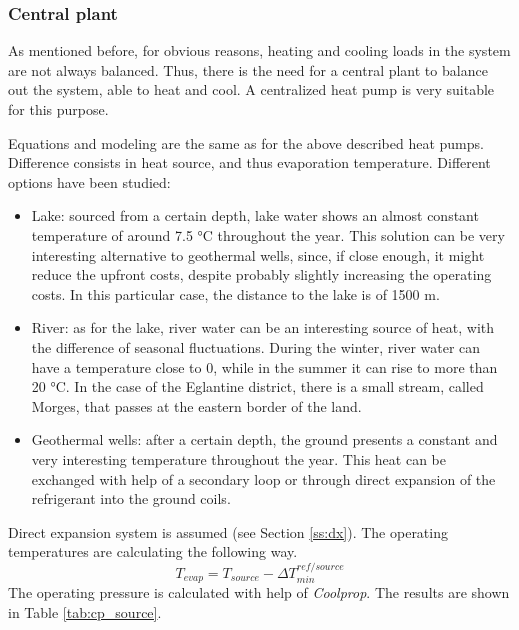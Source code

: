 \documentclass{article}
\begin{document}
\subsubsection{Central plant}
As mentioned before, for obvious reasons, heating and cooling loads in the system are not always balanced. Thus, there is the need for a central plant to balance out the system, able to heat and cool. A centralized heat pump is very suitable for this purpose.

Equations and modeling are the same as for the above described heat pumps. Difference consists in heat source, and thus evaporation temperature. Different options have been studied:
\begin{itemize}
    \item Lake: sourced from a certain depth, lake water shows an almost constant temperature of around 7.5 \si{\celsius} throughout the year. This solution can be very interesting alternative to geothermal wells, since, if close enough, it might reduce the upfront costs, despite probably slightly increasing the operating costs. In this particular case, the distance to the lake is of 1500 m.
    \item River: as for the lake, river water can be an interesting source of heat, with the difference of seasonal fluctuations. During the winter, river water can have a temperature close to 0, while in the summer it can rise to more than 20 \si{\celsius}. In the case of the Eglantine district, there is a small stream, called Morges, that passes at the eastern border of the land.
    \item Geothermal wells: after a certain depth, the ground presents a constant and very interesting temperature throughout the year. This heat can be exchanged with help of a secondary loop or through direct expansion of the refrigerant into the ground coils.
\end{itemize}

Direct expansion system is assumed (see Section \ref{ss:dx}).
The operating temperatures are calculating the following way.
\begin{equation}
    T_{evap} = T_{source} - \Delta T_{min}^{ref/source}
\end{equation}
The operating pressure is calculated with help of \textit{Coolprop}. The results are shown in Table \ref{tab:cp_source}.

\end{document}
